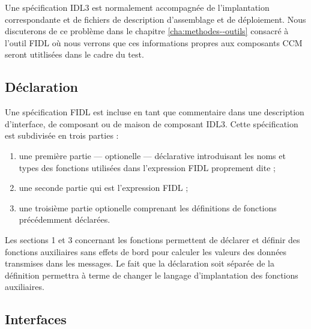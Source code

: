 Une sp\'ecification \textsf{IDL3} est normalement accompagn\'ee de
l'implantation correspondante et de fichiers de description
d'assemblage et de d\'eploiement. Nous  discuterons de ce probl\`eme
dans le chapitre \ref{cha:methodes--outils} consacr\'e \`a l'outil
\textsf{FIDL}  o\`u nous verrons que ces informations propres aux 
composants\textsf{ CCM } seront utitlis\'ees dans le cadre du test.

\subsection{D\'eclaration}

Une sp\'ecification \textsf{FIDL} est incluse en tant que commentaire dans une
description d'interface, de composant ou de maison de composant
\textsf{IDL3}. Cette sp\'ecification est subdivis\'ee en trois
parties :
\begin{enumerate}
  \item une premi\`ere partie --- optionelle --- d\'eclarative introduisant les noms et
    types des fonctions utilis\'ees dans l'expression \textsf{FIDL}
    proprement dite ;
  \item une seconde partie qui est l'expression \textsf{FIDL} ;
  \item une troisi\`eme partie optionelle comprenant les d\'efinitions
    de fonctions pr\'ec\'edemment d\'eclar\'ees. 
\end{enumerate}

Les sections 1 et 3  concernant les fonctions permettent de
d\'eclarer et d\'efinir
des fonctions auxiliaires sans effets de bord pour calculer les
valeurs des donn\'ees transmises dans les messages. Le fait que la
d\'eclaration soit s\'epar\'ee de la d\'efinition permettra \`a
terme de changer le langage d'implantation des fonctions auxiliaires.

\subsection{Interfaces}
\label{sect-interfaces}

